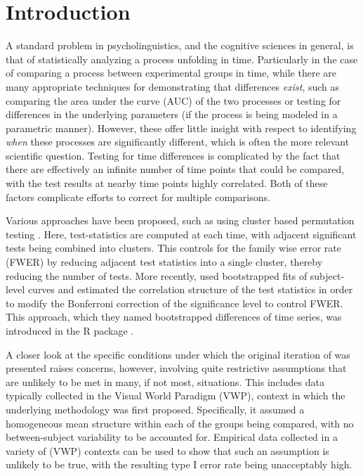 \section{Introduction}

A standard problem in psycholinguistics, and the cognitive sciences in general, is that of statistically analyzing a process unfolding in time. Particularly in the case of comparing a process between experimental groups in time, while there are many appropriate techniques for demonstrating that differences \textit{exist}, such as comparing the area under the curve (AUC) of the two processes or testing for differences in the underlying parameters (if the process is being modeled in a parametric manner). However, these offer little insight with respect to identifying \textit{when} these processes are significantly different, which is often the more relevant scientific question. Testing for time differences is complicated by the fact that there are effectively an infinite number of time points that could be compared, with the test results at nearby time points highly correlated. Both of these factors complicate efforts to correct for multiple comparisons.

Various approaches have been proposed, such as using cluster based permutation testing \cite{Maris2007}. Here, test-statistics are computed at each time, with adjacent significant tests being combined into clusters. This controls for the family wise error rate (FWER) by reducing adjacent test statistics into a single cluster, thereby reducing the number of tests. More recently, \cite{oleson2017detecting} used bootstrapped fits of subject-level curves and estimated the correlation structure of the test statistics in order to modify the Bonferroni correction of the significance level to control FWER. This approach, which they named bootstrapped differences of time series, was introduced in the R package  \cite{seedorff2018bdots}.

A closer look at the specific conditions under which the original iteration of  was presented raises concerns, however, involving quite restrictive assumptions that are unlikely to be met in many, if not most, situations. This includes data typically collected in the Visual World Paradigm (VWP), context in which the underlying methodology was first proposed. Specifically, it assumed a homogeneous mean structure within each of the groups being compared, with no between-subject variability to be accounted for. Empirical data collected in a variety of (VWP) contexts can be used to show that such an assumption is unlikely to be true, with the resulting type I error rate being unacceptably high.

